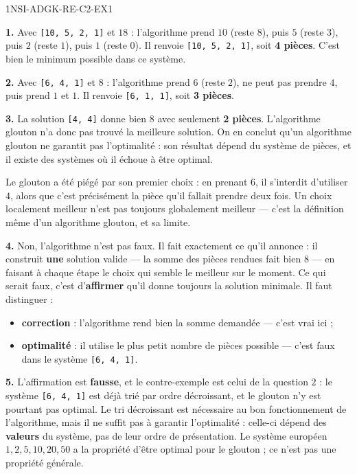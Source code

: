 \begin{corrige}{1NSI-ADGK-RE-C2-EX1}

\textbf{1.} Avec \lstinline{[10, 5, 2, 1]} et $18$ : l'algorithme prend $10$ (reste $8$),
puis $5$ (reste $3$), puis $2$ (reste $1$), puis $1$ (reste $0$). Il renvoie
\lstinline{[10, 5, 2, 1]}, soit \textbf{4 pièces}. C'est bien le minimum possible dans ce
système.

\textbf{2.} Avec \lstinline{[6, 4, 1]} et $8$ : l'algorithme prend $6$ (reste $2$), ne peut
pas prendre $4$, puis prend $1$ et $1$. Il renvoie \lstinline{[6, 1, 1]}, soit
\textbf{3 pièces}.

\textbf{3.} La solution \lstinline{[4, 4]} donne bien $8$ avec seulement \textbf{2 pièces}.
L'algorithme glouton n'a donc pas trouvé la meilleure solution. On en conclut qu'un
algorithme glouton ne garantit pas l'optimalité : son résultat dépend du système de pièces,
et il existe des systèmes où il échoue à être optimal.

Le glouton a été piégé par son premier choix : en prenant $6$, il s'interdit d'utiliser $4$,
alors que c'est précisément la pièce qu'il fallait prendre deux fois. Un choix localement
meilleur n'est pas toujours globalement meilleur — c'est la définition même d'un algorithme
glouton, et sa limite.

\textbf{4.} Non, l'algorithme n'est pas faux. Il fait exactement ce qu'il annonce : il
construit \textbf{une} solution valide — la somme des pièces rendues fait bien $8$ — en
faisant à chaque étape le choix qui semble le meilleur sur le moment. Ce qui serait faux,
c'est d'\textbf{affirmer} qu'il donne toujours la solution minimale. Il faut distinguer :
\begin{itemize}
  \item \textbf{correction} : l'algorithme rend bien la somme demandée — c'est vrai ici ;
  \item \textbf{optimalité} : il utilise le plus petit nombre de pièces possible — c'est
    faux dans le système \lstinline{[6, 4, 1]}.
\end{itemize}

\textbf{5.} L'affirmation est \textbf{fausse}, et le contre-exemple est celui de la question
$2$ : le système \lstinline{[6, 4, 1]} est déjà trié par ordre décroissant, et le glouton
n'y est pourtant pas optimal. Le tri décroissant est nécessaire au bon fonctionnement de
l'algorithme, mais il ne suffit pas à garantir l'optimalité : celle-ci dépend des
\textbf{valeurs} du système, pas de leur ordre de présentation. Le système européen
$1, 2, 5, 10, 20, 50$ a la propriété d'être optimal pour le glouton ; ce n'est pas une
propriété générale.

\end{corrige}
